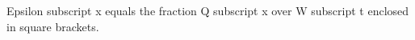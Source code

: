 Epsilon subscript x equals the fraction Q subscript x over W subscript t enclosed in square brackets.
